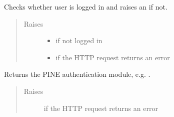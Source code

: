 \documentclass[letterpaper,10pt,english]{sphinxmanual}
\begin{document}
\begin{fulllineitems}
\begin{fulllineitems}
\label{\detokenize{autoapi/pine/client/client/index:pine.client.client.PineClient._check_login}}
Checks whether user is logged in and raises an {\hyperref[\detokenize{autoapi/pine/client/exceptions/index:pine.client.exceptions.PineClientAuthException}]{}} if not.
\begin{quote}\begin{description}
\item[{Raises}] \leavevmode\begin{itemize}
\item {} 
{\hyperref[\detokenize{autoapi/pine/client/exceptions/index:pine.client.exceptions.PineClientAuthException}]{}} \textendash{} if not logged in

\item {} 
{\hyperref[\detokenize{autoapi/pine/client/exceptions/index:pine.client.exceptions.PineClientHttpException}]{}} \textendash{} if the HTTP request returns an error

\end{itemize}

\end{description}\end{quote}

\end{fulllineitems}


\begin{fulllineitems}
\label{\detokenize{autoapi/pine/client/client/index:pine.client.client.PineClient.get_auth_module}}
Returns the PINE authentication module, e.g. .
\begin{quote}\begin{description}
\item[{Raises}] \leavevmode
{\hyperref[\detokenize{autoapi/pine/client/exceptions/index:pine.client.exceptions.PineClientHttpException}]{}} \textendash{} if the HTTP request returns an error


\end{description}
\end{quote}
\end{fulllineitems}
\end{fulllineitems}
\end{document}
